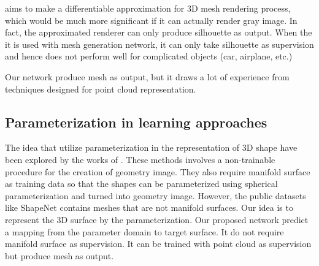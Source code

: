 \cite{3Drender} aims to make a differentiable approximation for 3D mesh rendering process, which would be much more significant if it can actually render gray image. In fact, the approximated renderer can only produce silhouette as output. When the it is used with mesh generation network, it can only take silhouette as supervision and hence does not perform well for complicated objects (car, airplane, etc.)

Our network produce mesh as output, but it draws a lot of experience from techniques designed for point cloud representation.

\subsection{Parameterization in learning approaches}
 The idea that utilize parameterization in the representation of 3D shape have been explored by the works of \cite{surfnet,geoimg}. These methods involves a non-trainable procedure for the creation of geometry image. They also require manifold surface as training data so that the shapes can be parameterized using spherical parameterization and turned into geometry image. However, the public datasets like ShapeNet\cite{shapenetdata} contains meshes that are not manifold surfaces. Our idea is to represent the 3D surface by the parameterization. Our proposed network predict a mapping from the parameter domain to target surface. It do not require manifold surface as supervision. It can be trained with point cloud as supervision but produce mesh as output.
